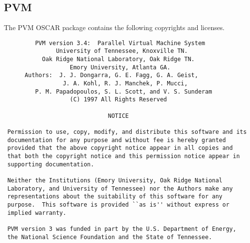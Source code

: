 %
%
% 
% 
% 
% 
%

\subsection{PVM}
The PVM OSCAR package contains the following copyrights and licenses.

\begin{verbatim}
         PVM version 3.4:  Parallel Virtual Machine System
               University of Tennessee, Knoxville TN.
           Oak Ridge National Laboratory, Oak Ridge TN.
                   Emory University, Atlanta GA.
      Authors:  J. J. Dongarra, G. E. Fagg, G. A. Geist,
                 J. A. Kohl, R. J. Manchek, P. Mucci,
         P. M. Papadopoulos, S. L. Scott, and V. S. Sunderam
                   (C) 1997 All Rights Reserved

                              NOTICE

 Permission to use, copy, modify, and distribute this software and its
 documentation for any purpose and without fee is hereby granted
 provided that the above copyright notice appear in all copies and
 that both the copyright notice and this permission notice appear in
 supporting documentation.
 
 Neither the Institutions (Emory University, Oak Ridge National
 Laboratory, and University of Tennessee) nor the Authors make any
 representations about the suitability of this software for any
 purpose.  This software is provided ``as is'' without express or
 implied warranty.
 
 PVM version 3 was funded in part by the U.S. Department of Energy,
 the National Science Foundation and the State of Tennessee.
\end{verbatim}

